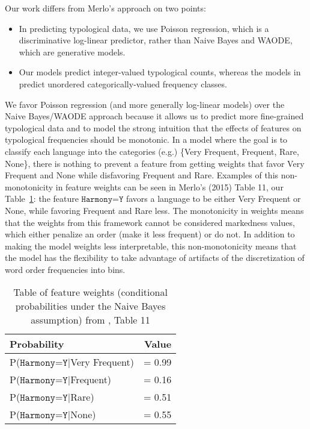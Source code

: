 \documentclass[11pt]{article}
\begin{document}
Our work differs from Merlo's approach on two points:
\begin{itemize}
\item In predicting typological data, we use Poisson regression, which is a discriminative log-linear predictor, rather than Naive Bayes and WAODE, which are generative models.
\item Our models predict integer-valued typological counts, whereas the models in \citet{merlo2015predicting} predict unordered categorically-valued frequency classes.
\end{itemize}

We favor Poisson regression (and more generally log-linear models) over the Naive Bayes/WAODE approach because it allows us to predict more fine-grained typological data and to model the strong intuition that the effects of features on typological frequencies should be monotonic.
In a model where the goal is to classify each language into the categories (e.g.) \{Very Frequent, Frequent, Rare, None\}, there is nothing to prevent a feature from getting weights that favor Very Frequent and None while disfavoring Frequent and Rare.
Examples of this non-monotonicity in feature weights can be seen in Merlo's (2015) Table 11, our Table~\ref{tab:merlo-table}: the feature $\texttt{Harmony=Y}$ favors a language to be either Very Frequent or None, while favoring Frequent and Rare less.
The monotonicity in weights means that the weights from this framework cannot be considered markedness values, which either penalize an order (make it less frequent) or do not.
In addition to making the model weights less interpretable, this non-monotonicity means that the model has the flexibility to take advantage of artifacts of the discretization of word order frequencies into bins.

\begin{table}
  \centering
  \begin{tabular}{|l r|}
    \hline
    Probability & Value \\
    \hline
    P($\texttt{Harmony=Y}|$Very Frequent) & = 0.99 \\
    P($\texttt{Harmony=Y}|$Frequent) & = 0.16 \\
    P($\texttt{Harmony=Y}|$Rare) & = 0.51 \\
    P($\texttt{Harmony=Y}|$None) & = 0.55 \\    
    \hline
  \end{tabular}
  \caption{Table of feature weights (conditional probabilities under the Naive Bayes assumption) from \citet{merlo2015predicting}, Table 11}
  \label{tab:merlo-table}
\end{table}
\end{document}
